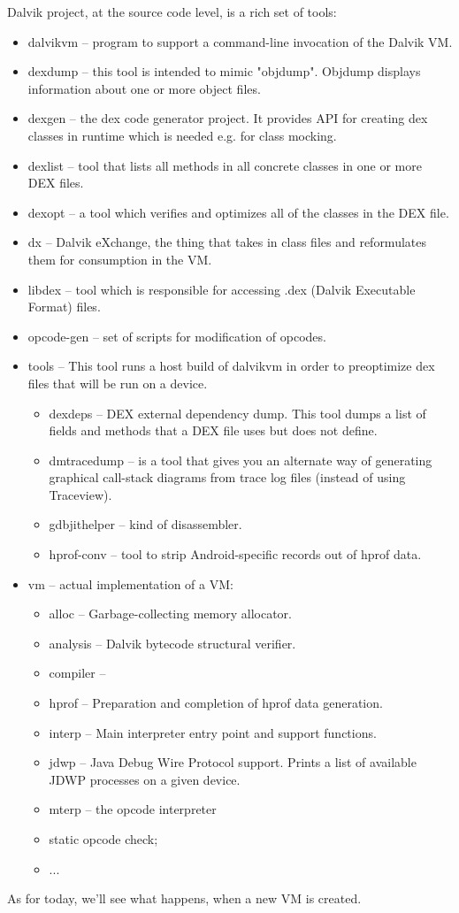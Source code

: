 \documentclass[10pt,a4paper]{article}
\begin{document}
Dalvik project, at the source code level, is a rich set of tools:
\begin{itemize}
  \item dalvikvm --  program to support a command-line invocation of the Dalvik VM.
  \item dexdump -- this tool is intended to mimic "objdump". Objdump displays information about one or more object files.
  \item dexgen -- the dex code generator project. It provides API for creating dex classes in runtime which is needed e.g. for class mocking.
  \item dexlist -- tool that lists all methods in all concrete classes in one or more DEX files.
  \item dexopt -- a tool which verifies and optimizes all of the classes in the DEX file.
  \item dx -- Dalvik eXchange, the thing that takes in class files and reformulates them for consumption in the VM.
  \item libdex -- tool which is responsible for accessing .dex (Dalvik Executable Format) files.
  \item opcode-gen -- set of scripts for modification of opcodes.
  \item tools -- This tool runs a host build of dalvikvm in order to preoptimize dex files that will be run on a device.
  \begin{itemize}
    \item dexdeps -- DEX external dependency dump. This tool dumps a list of fields and methods that a DEX file uses but does not define.
    \item dmtracedump -- is a tool that gives you an alternate way of generating graphical call-stack diagrams from trace log files (instead of using Traceview).
    \item gdbjithelper -- kind of disassembler.
    \item hprof-conv -- tool to strip Android-specific records out of hprof data.
  \end{itemize}
  \item vm -- actual implementation of a VM:
  \begin{itemize}
    \item alloc -- Garbage-collecting memory allocator.
    \item analysis -- Dalvik bytecode structural verifier. 
    \item compiler --
    \item hprof -- Preparation and completion of hprof data generation. 
    \item interp -- Main interpreter entry point and support functions.
    \item jdwp -- Java Debug Wire Protocol support. Prints a list of available JDWP processes on a given device. 
    \item mterp -- the opcode interpreter
    \item static opcode check;
    \item ...
  \end{itemize}
\end{itemize}

As for today, we'll see what happens, when a new VM is created.
\end{document}
